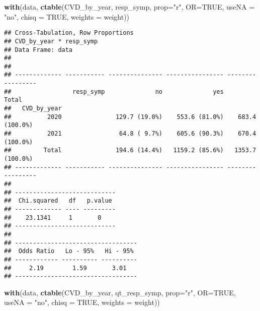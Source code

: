 \documentclass[
]{article}
\newenvironment{Shaded}{\begin{snugshade}}{\end{snugshade}}
\newcommand{\AttributeTok}[1]{\textcolor[rgb]{0.13,0.29,0.53}{#1}}
\newcommand{\ConstantTok}[1]{\textcolor[rgb]{0.56,0.35,0.01}{#1}}
\newcommand{\FunctionTok}[1]{\textcolor[rgb]{0.13,0.29,0.53}{\textbf{#1}}}
\newcommand{\NormalTok}[1]{#1}
\newcommand{\StringTok}[1]{\textcolor[rgb]{0.31,0.60,0.02}{#1}}
\begin{document}
\begin{Shaded}
\begin{Highlighting}[]
\FunctionTok{with}\NormalTok{(data, }\FunctionTok{ctable}\NormalTok{(CVD\_by\_year, resp\_symp, }\AttributeTok{prop=}\StringTok{"r"}\NormalTok{, }\AttributeTok{OR=}\ConstantTok{TRUE}\NormalTok{, }\AttributeTok{useNA =} \StringTok{"no"}\NormalTok{, }\AttributeTok{chisq =} \ConstantTok{TRUE}\NormalTok{, }\AttributeTok{weights =}\NormalTok{ weight))}
\end{Highlighting}
\end{Shaded}

\begin{verbatim}
## Cross-Tabulation, Row Proportions  
## CVD_by_year * resp_symp  
## Data Frame: data  
## 
## 
## ------------- ----------- --------------- ---------------- -----------------
##                 resp_symp              no              yes             Total
##   CVD_by_year                                                               
##          2020               129.7 (19.0%)    553.6 (81.0%)    683.4 (100.0%)
##          2021                64.8 ( 9.7%)    605.6 (90.3%)    670.4 (100.0%)
##         Total               194.6 (14.4%)   1159.2 (85.6%)   1353.7 (100.0%)
## ------------- ----------- --------------- ---------------- -----------------
## 
## ----------------------------
##  Chi.squared   df   p.value 
## ------------- ---- ---------
##    23.1341     1       0    
## ----------------------------
## 
## ----------------------------------
##  Odds Ratio   Lo - 95%   Hi - 95% 
## ------------ ---------- ----------
##     2.19        1.59       3.01   
## ----------------------------------
\end{verbatim}

\begin{Shaded}
\begin{Highlighting}[]
\FunctionTok{with}\NormalTok{(data, }\FunctionTok{ctable}\NormalTok{(CVD\_by\_year, qt\_resp\_symp, }\AttributeTok{prop=}\StringTok{"r"}\NormalTok{, }\AttributeTok{OR=}\ConstantTok{TRUE}\NormalTok{, }\AttributeTok{useNA =} \StringTok{"no"}\NormalTok{, }\AttributeTok{chisq =} \ConstantTok{TRUE}\NormalTok{, }\AttributeTok{weights =}\NormalTok{ weight))}
\end{Highlighting}
\end{Shaded}
\end{document}
